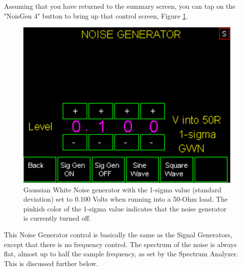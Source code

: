 Assuming that you have returned to the summary screen, you can tap on the "\textsf{NoisGen 4}" button to bring up that control screen, Figure  \ref{AVNA_024-label}.
\begin{figure}[H]
\begin{center}
\includegraphics[scale=0.75]{./images/AVNA_024.pdf}
\caption{Gaussian White Noise generator with the 1-sigma value (standard deviation) set to 0.100 Volts when running into a 50-Ohm load.  The pinkish color of the 1-sigma value indicates that the noise generator is currently turned off.}
\label{AVNA_024-label}
\end{center}
\end{figure}
%
This Noise Generator control is basically the same as the Signal Generators, except that there is no frequency control.  The spectrum of the noise is always flat, almost up to half the sample frequency, as set by the Spectrum Analyzer.  This is discussed further below.

